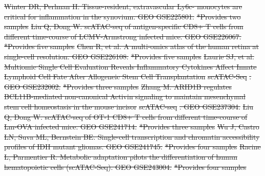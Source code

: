 \documentclass[referee, pdflatex, sn-vancouver-num]{sn-jnl}
\providecommand{\DIFdeltex}[1]{{\protect\color{red}\sout{#1}}}                      %
\providecommand{\DIFdel}[1]{\texorpdfstring{\DIFdeltex{#1}}{}} %
\begin{document}
\begin{appendices}
\DIFdel{Winter DR, Perlman H. Tissue-resident, extravascular Ly6c- monocytes are critical for inflammation in the synovium. GEO GSE225801. }%
\DIFdel{*Provides two samples
	}%
\DIFdel{Liu Q, Dong W. scATAC-seq of antigen-specific CD8+ T cells from different time-course of LCMV-Armstrong infected mice. GEO GSE226067. }%
\DIFdel{*Provides five samples
	}%
\DIFdel{Chen R, et al. A multi-omics atlas of the human retina at single-cell resolution. GEO GSE226108. }%
\DIFdel{*Provides five samples
	}%
\DIFdel{Laurie SJ, et al. Multiomic Single Cell Evaluation Reveals Inflammatory Cytokines Affect Innate Lymphoid Cell Fate After Allogeneic Stem Cell Transplantation }%
\DIFdel{scATAC-Seq}%
\DIFdel{. GEO GSE232002. }%
\DIFdel{*Provides three samples
	}%
\DIFdel{Zhang M. ARID1B regulates BCL11B-mediated non-canonical Activin signaling to maintain mesenchymal stem cell homeostasis in the mouse incisor }%
\DIFdel{scATAC-seq}%
\DIFdel{. GEO GSE237304. }%
\DIFdel{Liu Q, Dong W. scATAC-seq of OT-1 CD8+ T cells from different time-course of Lm-OVA infected mice. GEO GSE241714. }%
\DIFdel{*Provides three samples
	}%
\DIFdel{Wu J, Castro LN, Suva ML, Bernstein BE. Single-cell transcription and chromatin accessibility profiles of IDH mutant gliomas. GEO GSE241745. }%
\DIFdel{*Provides four samples
	}%
\DIFdel{Racine L, Parmentier R. Metabolic adaptation pilots the differentiation of human hematopoietic cells (scATAC-Seq). GEO GSE243004. }%
\DIFdel{*Provides four samples
}
\end{appendices}
\end{document}
